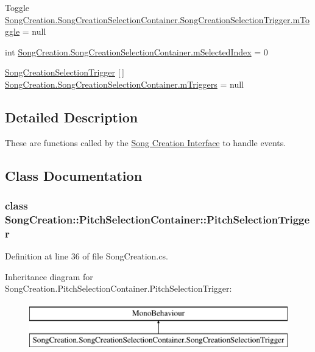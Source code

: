 \begin{DoxyCompactItemize}
\item 
Toggle \hyperlink{group___s_c_handlers_gaffc6248c907c4357b0a0a30b86635f3a}{Song\+Creation.\+Song\+Creation\+Selection\+Container.\+Song\+Creation\+Selection\+Trigger.\+m\+Toggle} = null
\item 
int \hyperlink{group___s_c_handlers_ga33015c7ac7e8cebb24b1fc97c70b4ed7}{Song\+Creation.\+Song\+Creation\+Selection\+Container.\+m\+Selected\+Index} = 0
\item 
\hyperlink{group___s_c_handlers_class_song_creation_1_1_song_creation_selection_container_1_1_song_creation_selection_trigger}{Song\+Creation\+Selection\+Trigger} \mbox{[}$\,$\mbox{]} \hyperlink{group___s_c_handlers_ga89fbb92f878e65f27bee6edbf920da22}{Song\+Creation.\+Song\+Creation\+Selection\+Container.\+m\+Triggers} = null
\end{DoxyCompactItemize}


\subsection{Detailed Description}
These are functions called by the \hyperlink{group___doc_s_c}{Song Creation Interface} to handle events. 

\subsection{Class Documentation}
\label{class_song_creation_1_1_pitch_selection_container_1_1_pitch_selection_trigger}
\subsubsection{class Song\+Creation\+:\+:Pitch\+Selection\+Container\+:\+:Pitch\+Selection\+Trigger}


Definition at line 36 of file Song\+Creation.\+cs.

Inheritance diagram for Song\+Creation.\+Pitch\+Selection\+Container.\+Pitch\+Selection\+Trigger\+:\begin{figure}[H]
\begin{center}
\leavevmode
\includegraphics[height=2.000000cm]{group___s_c_handlers}
\end{center}
\end{figure}
